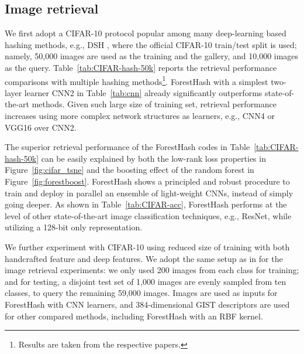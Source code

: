 \documentclass[runningheads]{llncs}
\begin{document}
\subsection{Image retrieval}
We first adopt a CIFAR-10 protocol popular among many deep-learning based
hashing methods, e.g., DSH \cite{DSH}, where the official CIFAR-10 train/test
split is used; namely, 50,000 images are used as the training and the gallery,
and 10,000 images as the query.  Table~\ref{tab:CIFAR-hash-50k} reports the
retrieval performance comparisons with multiple hashing methods\footnote{Results
  are taken from the respective papers.}. ForestHash with a simplest two-layer
learner {CNN2} in Table~\ref{tab:cnn} already significantly outperforms
state-of-the-art methods. Given such large size of training set, retrieval
performance increases using more complex network structures as learners, e.g.,
{CNN4} or {VGG16} over {CNN2}.
    
  
The superior retrieval performance of the ForestHash codes in
Table~\ref{tab:CIFAR-hash-50k} can be easily explained by both the low-rank loss
properties in Figure~\ref{fig:cifar_tsne} and the boosting effect of the random
forest in Figure~\ref{fig:forestboost}.  ForestHash shows a principled and
robust procedure to train and deploy in parallel an ensemble of light-weight
CNNs, instead of simply going deeper.  As shown in Table~\ref{tab:CIFAR-acc},
ForestHash performs at the level of other state-of-the-art image classification
techniques, e.g., ResNet, while utilizing a 128-bit only representation.
    

We further experiment with CIFAR-10 using reduced size of training with both handcrafted feature and deep features.  We adopt
the same setup as in \cite{KSH, sparsehash} for the image retrieval experiments:
we only used 200 images from each class for training; and for testing, a
disjoint test set of 1,000 images are evenly sampled from ten classes, to query
the remaining 59,000 images.  Images are used as inputs for ForestHash with CNN
learners, and 384-dimensional GIST descriptors are used for other compared
methods, including ForestHash with an RBF kernel. 
\end{document}

